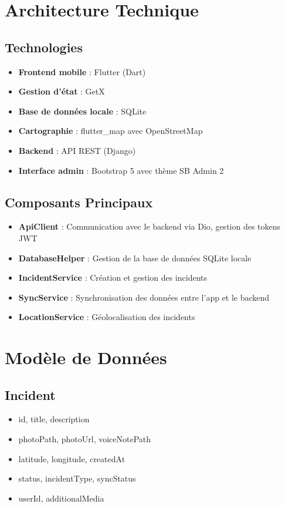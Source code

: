 \documentclass[12pt,a4paper]{article}
\begin{document}
\section*{Architecture Technique}

\subsection*{Technologies}

\begin{itemize}
    \item \textbf{Frontend mobile} : Flutter (Dart)
    \item \textbf{Gestion d'état} : GetX
    \item \textbf{Base de données locale} : SQLite
    \item \textbf{Cartographie} : flutter\_map avec OpenStreetMap
    \item \textbf{Backend} : API REST (Django)
    \item \textbf{Interface admin} : Bootstrap 5 avec thème SB Admin 2
\end{itemize}

\subsection*{Composants Principaux}

\begin{itemize}
    \item \textbf{ApiClient} : Communication avec le backend via Dio, gestion des tokens JWT
    \item \textbf{DatabaseHelper} : Gestion de la base de données SQLite locale
    \item \textbf{IncidentService} : Création et gestion des incidents
    \item \textbf{SyncService} : Synchronisation des données entre l'app et le backend
    \item \textbf{LocationService} : Géolocalisation des incidents
\end{itemize}

\section*{Modèle de Données}

\subsection*{Incident}
\begin{itemize}
    \item id, title, description
    \item photoPath, photoUrl, voiceNotePath
    \item latitude, longitude, createdAt
    \item status, incidentType, syncStatus
    \item userId, additionalMedia
\end{itemize}
\end{document}
